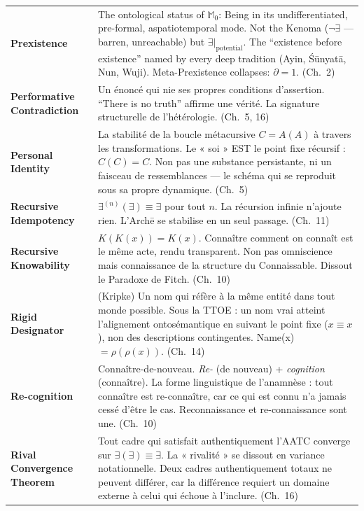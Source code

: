 \documentclass[10pt, openany, oneside]{book}
\renewcommand{\footnotesize}{\fontsize{8.5}{11}\selectfont}
\begin{document}
{\footnotesize
\noindent\begin{tabular}{@{} l @{\hspace{0.6em}} p{} @{}}
\textbf{Prexistence} & The ontological status of $\mathbb{M}_0$: Being in its undifferentiated, pre-formal, aspatiotemporal mode. Not the Kenoma ($\neg\exists$ --- barren, unreachable) but $\exists|_{\text{potential}}$. The ``existence before existence'' named by every deep tradition (Ayin, \'{S}\={u}nyat\={a}, Nun, Wuji). Meta-Prexistence collapses: $\partial = 1$. (Ch.\ 2) \\[0.3em]
\textbf{Performative Contradiction} & Un énoncé qui nie ses propres conditions d'assertion. ``There is no truth'' affirme une vérité. La signature structurelle de l'hétérologie. (Ch.\ 5, 16) \\[0.3em]
\textbf{Personal Identity} & La stabilité de la boucle métacursive $C = A(A)$ à travers les transformations. Le « soi » EST le point fixe récursif : $C(C) = C$. Non pas une substance persistante, ni un faisceau de ressemblances --- le schéma qui se reproduit sous sa propre dynamique. (Ch.\ 5) \\[0.3em]
\textbf{Recursive Idempotency} & $\exists^{(n)}(\exists) \equiv \exists$ pour tout $n$. La récursion infinie n'ajoute rien. L'Arch\={e} se stabilise en un seul passage. (Ch.\ 11) \\[0.3em]
\textbf{Recursive Knowability} & $K(K(x)) = K(x)$. Connaître comment on connaît est le même acte, rendu transparent. Non pas omniscience mais connaissance de la structure du Connaissable. Dissout le Paradoxe de Fitch. (Ch.\ 10) \\[0.3em]
\textbf{Rigid Designator} & (Kripke) Un nom qui réfère à la même entité dans tout monde possible. Sous la TTOE : un nom vrai atteint l'alignement ontosémantique en suivant le point fixe ($x \equiv x$), non des descriptions contingentes. Name(x) $= \rho(\rho(x))$. (Ch.\ 14) \\[0.3em]
\textbf{Re-cognition} & Connaître-de-nouveau. \textit{Re-} (de nouveau) + \textit{cognition} (connaître). La forme linguistique de l'anamnèse : tout connaître est re-connaître, car ce qui est connu n'a jamais cessé d'être le cas. Reconnaissance et re-connaissance sont une. (Ch.\ 10) \\[0.3em]
\textbf{Rival Convergence Theorem} & Tout cadre qui satisfait authentiquement l'AATC converge sur $\exists(\exists) \equiv \exists$. La « rivalité » se dissout en variance notationnelle. Deux cadres authentiquement totaux ne peuvent différer, car la différence requiert un domaine externe à celui qui échoue à l'inclure. (Ch.\ 16) \\[0.3em]

\end{tabular}}
\end{document}
